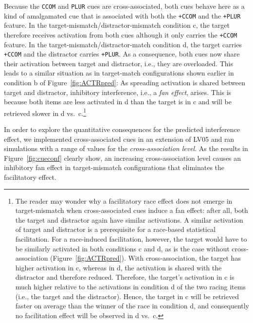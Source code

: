 \documentclass{cambridge7A}\usepackage[]{graphicx}\usepackage[]{color}
\newcommand{\actrcue}[1]{\texttt{\uppercase{#1}}}
\newcommand{\match}[1]{\texttt{+\uppercase{#1}}}
\newcommand{\revised}[1]{#1}
\newcommand{\revFE}[1]{#1}
\begin{document}
Because the \actrcue{ccom} and \actrcue{plur} cues are cross-associated, both cues behave here as a kind of amalgamated cue that is associated with both the \match{ccom} and the \match{plur} feature. 
In the target-mismatch/distractor-mismatch condition c, the target therefore receives activation from both cues although it only carries the \match{ccom} feature.
In the target-mismatch/distractor-match condition d, the target carries \match{ccom} and the distractor carries \match{plur}. As a consequence, both cues now share their activation between target and distractor, i.e., they are overloaded. 
This leads to a similar situation as in target-match configurations shown earlier in condition b of Figure~\ref{fig:ACTRpred}: As spreading activation is shared between target and distractor, inhibitory interference, i.e., a \emph{fan effect}, arises.
This is because both items are less activated in d than the target is in c and will be retrieved slower in d vs.\ c.\footnote{\revised{The reader may wonder why a facilitatory race effect does not emerge in target-mismatch when cross-associated cues induce a fan effect: after all, both the target and distractor again have similar activations. A similar activation of target and distractor is   a prerequisite for a race-based statistical facilitation. 
For a race-induced facilitation, however, the target would have to be similarly activated in both conditions c and d, as is the case without cross-association (Figure~\ref{fig:ACTRpred}). With cross-association, the target has higher activation in c, whereas in d, the activation is shared with the distractor and therefore reduced. Therefore, the target's activation in c is much higher relative to the activations in condition d of the two racing items (i.e., the target and the distractor). Hence, the target in c will be retrieved faster on average than the winner of the race in condition d, and consequently no facilitation effect will be observed in d vs.\ c. 
}} 




\revFE{
In order to explore the quantitative consequences for the predicted interference effect, we implemented cross-associated cues in an extension of LV05 and ran simulations with a range of values for the \emph{cross-association level}.
As the results in Figure~\ref{fig:cueconf} clearly show, an increasing cross-association level causes an inhibitory fan effect in target-mismatch configurations that eliminates the facilitatory effect.
}
\end{document}
